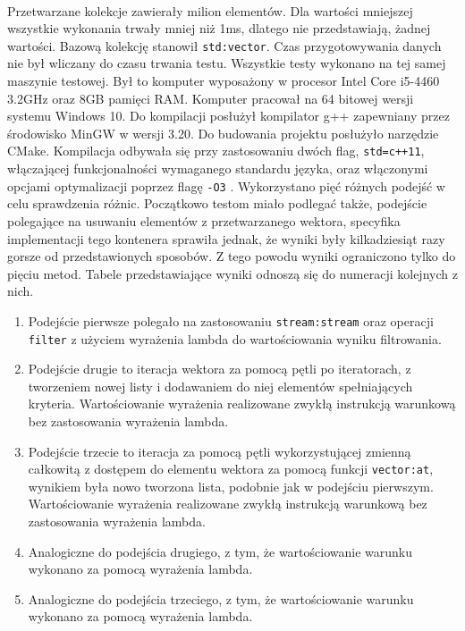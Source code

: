 \documentclass[a4paper,10pt]{report}
\begin{document}
\paragraph{}
Przetwarzane kolekcje zawierały milion elementów. Dla wartości mniejszej wszystkie wykonania trwały mniej niż 1ms, dlatego nie przedstawiają, żadnej wartości. Bazową kolekcję stanowił \verb|std:vector|. Czas przygotowywania danych nie był wliczany do czasu trwania testu. Wszystkie testy wykonano na tej samej maszynie testowej. Był to komputer wyposażony w procesor Intel Core i5-4460 3.2GHz oraz 8GB pamięci RAM. Komputer pracował na 64 bitowej wersji systemu Windows 10. Do kompilacji posłużył kompilator g++ zapewniany przez środowisko MinGW w wersji 3.20. Do budowania projektu posłużyło narzędzie CMake. Kompilacja odbywała się przy zastosowaniu dwóch flag, \verb|std=c++11|, włączającej funkcjonalności wymaganego standardu języka, oraz włączonymi opcjami optymalizacji poprzez flagę \verb|-O3| \cite{optymalizacja}.
Wykorzystano pięć różnych podejść w celu sprawdzenia różnic. Początkowo testom miało podlegać także, podejście polegające na usuwaniu elementów z przetwarzanego wektora, specyfika implementacji tego kontenera sprawiła jednak, że wyniki były kilkadziesiąt razy gorsze od przedstawionych sposobów. Z tego powodu wyniki ograniczono tylko do pięciu metod. Tabele przedstawiające wyniki odnoszą się do numeracji kolejnych z nich.
\begin{enumerate}
\item Podejście pierwsze polegało na zastosowaniu \verb|stream:stream| oraz operacji \verb|filter| z użyciem wyrażenia lambda do wartościowania wyniku filtrowania.
\item Podejście drugie to iteracja wektora za pomocą pętli po iteratorach, z tworzeniem nowej listy i dodawaniem do niej elementów spełniających kryteria. Wartościowanie wyrażenia realizowane zwykłą instrukcją warunkową bez zastosowania wyrażenia lambda.
\item Podejście trzecie to iteracja za pomocą pętli wykorzystującej zmienną całkowitą z dostępem do elementu wektora za pomocą funkcji \verb|vector:at|, wynikiem była nowo tworzona lista, podobnie jak w podejściu pierwszym. Wartościowanie wyrażenia realizowane zwykłą instrukcją warunkową bez zastosowania wyrażenia lambda.
\item Analogiczne do podejścia drugiego, z tym, że wartościowanie warunku wykonano za pomocą wyrażenia lambda.
\item Analogiczne do podejścia trzeciego, z tym, że wartościowanie warunku wykonano za pomocą wyrażenia lambda.
\end{enumerate}
\end{document}
